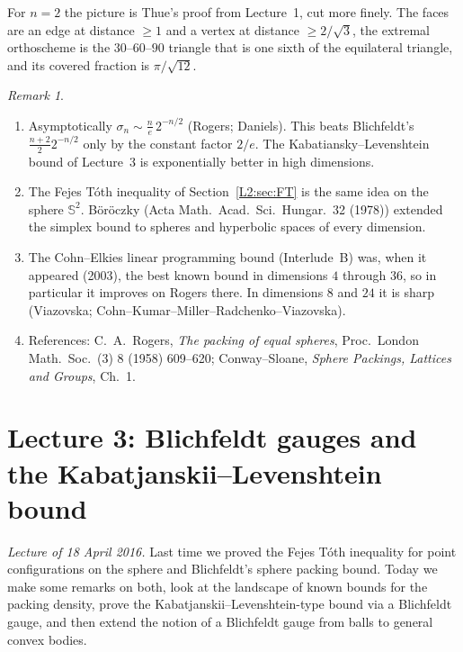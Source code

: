 \documentclass[11pt,openany]{book}
\theoremstyle{plain}
\theoremstyle{definition}
\theoremstyle{remark}
\newtheorem{remark}[theorem]{Remark}
\newcommand{\orig}[1]{\marginpar{\raggedright\scriptsize\color{gray}#1}}
\newcommand{\Sph}{\mathbb{S}}          %
\begin{document}
For $n=2$ the picture is Thue's proof from Lecture~1, cut more finely. The faces are an edge at
distance $\ge1$ and a vertex at distance $\ge2/\sqrt3$, the extremal orthoscheme is the $30$--$60$--$90$
triangle that is one sixth of the equilateral triangle, and its covered fraction is $\pi/\sqrt{12}$.

\begin{remark}
\begin{enumerate}[nosep]
\item Asymptotically $\sigma_n\sim\frac{n}{e}\,2^{-n/2}$ (Rogers; Daniels). This beats Blichfeldt's
  $\frac{n+2}{2}2^{-n/2}$ only by the constant factor $2/e$. The Kabatiansky--Levenshtein bound of
  Lecture~3 is exponentially better in high dimensions.
\item The Fejes T\'oth inequality of Section~\ref{L2:sec:FT} is the same idea on the sphere $\Sph^2$.
  B\"or\"oczky (Acta Math.\ Acad.\ Sci.\ Hungar.\ 32 (1978)) extended the simplex bound to spheres and
  hyperbolic spaces of every dimension.
\item The Cohn--Elkies linear programming bound (Interlude~B) was, when it appeared (2003), the best known
  bound in dimensions $4$ through $36$, so in particular it improves on Rogers there. In dimensions $8$
  and $24$ it is sharp (Viazovska; Cohn--Kumar--Miller--Radchenko--Viazovska).
\item References: C.~A.~Rogers, \emph{The packing of equal spheres}, Proc.\ London Math.\ Soc.\ (3) 8
  (1958) 609--620; Conway--Sloane, \emph{Sphere Packings, Lattices and Groups}, Ch.~1.
\end{enumerate}
\end{remark}
\chapter[Lecture 3: Blichfeldt gauges, Kabatjanskii--Levenshtein]{Lecture 3: Blichfeldt gauges and the Kabatjanskii--Levenshtein bound}
\label{L3:ch}

\noindent\emph{Lecture of 18 April 2016.}\orig{Notes pp.~32--48.}
Last time we proved the Fejes T\'oth inequality for point configurations on the sphere and
Blichfeldt's sphere packing bound. Today we make some remarks on both, look at the landscape of
known bounds for the packing density, prove the Kabatjanskii--Levenshtein-type bound via a Blichfeldt
gauge, and then extend the notion of a Blichfeldt gauge from balls to general convex bodies.
\end{document}
